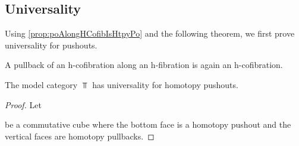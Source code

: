 \subsection*{Universality}
Using \cref{prop:poAlongHCofibIsHtpyPo} and the following theorem, we first prove universality for pushouts.
\begin{thm}\label{thm:pbOfHcofibIsHcofib}
    A pullback of an h-cofibration along an h-fibration is again an h-cofibration.
    \begin{reference}
        \cite[Theorem 12]{note_on_cofibs_2}
    \end{reference}
\end{thm}
\begin{prop}\label{lem:topUniversalPo}
    The model category $\Top$ has universality for homotopy pushouts.
    \begin{proof}
        Let 
        \begin{center}
        \end{center}
        be a commutative cube where the bottom face is a homotopy pushout and the vertical faces are homotopy pullbacks.
        

\end{proof}
\end{prop}
